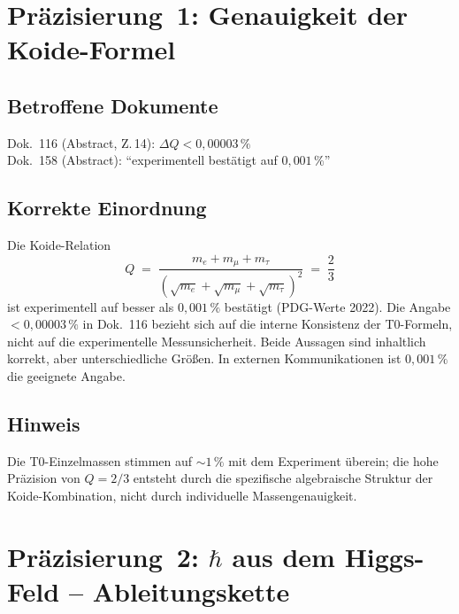 \section{Präzisierung~1: Genauigkeit der Koide-Formel}

\subsection*{Betroffene Dokumente}

Dok.~116 (Abstract, Z.\,14): $\Delta Q < 0{,}00003\,\%$ \\
Dok.~158 (Abstract): \enquote{experimentell bestätigt auf $0{,}001\,\%$}

\subsection*{Korrekte Einordnung}

Die Koide-Relation
\begin{equation}
  Q \;=\; \frac{m_e + m_\mu + m_\tau}
               {(\sqrt{m_e}+\sqrt{m_\mu}+\sqrt{m_\tau})^2}
  \;=\; \frac{2}{3}
  \tag{190.7}
\end{equation}
ist experimentell auf besser als $0{,}001\,\%$ bestätigt
(PDG-Werte 2022). Die Angabe $< 0{,}00003\,\%$ in Dok.~116 bezieht
sich auf die interne Konsistenz der T0-Formeln, nicht auf die
experimentelle Messunsicherheit. Beide Aussagen sind inhaltlich korrekt,
aber unterschiedliche Größen. In externen Kommunikationen ist
$0{,}001\,\%$ die geeignete Angabe.

\subsection*{Hinweis}

Die T0-Einzelmassen stimmen auf $\sim 1\,\%$ mit dem Experiment überein;
die hohe Präzision von $Q = 2/3$ entsteht durch die spezifische
algebraische Struktur der Koide-Kombination, nicht durch individuelle
Massengenauigkeit.

\section{\texorpdfstring{Präzisierung~2: $\hbar$ aus dem Higgs-Feld -- Ableitungskette}{Praezisierung 2: hbar aus dem Higgs-Feld -- Ableitungskette}}

